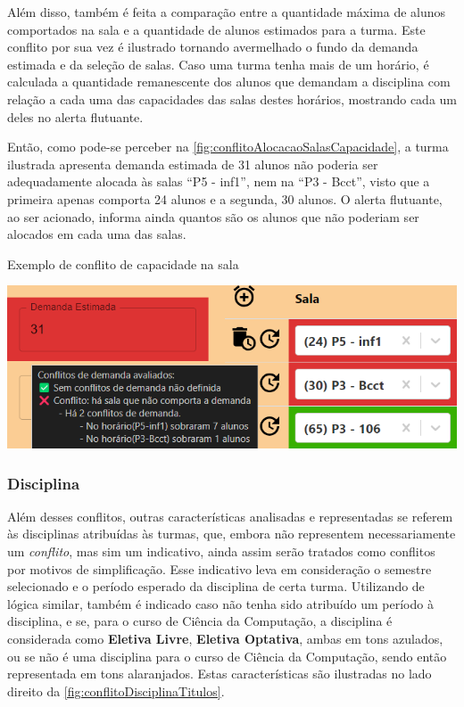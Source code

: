 Além disso, também é feita a comparação entre a quantidade máxima de alunos comportados na sala e a quantidade de alunos estimados para a turma. Este conflito por sua vez é ilustrado tornando avermelhado o fundo da demanda estimada e da seleção de salas. Caso uma turma tenha mais de um horário, é calculada a quantidade remanescente dos alunos que demandam a disciplina com relação a cada uma das capacidades das salas destes horários, mostrando cada um deles no alerta flutuante.

Então, como pode-se perceber na \autoref{fig:conflitoAlocacaoSalasCapacidade}, a turma ilustrada apresenta demanda estimada de 31 alunos não poderia ser adequadamente alocada às salas ``P5 - inf1'', nem na ``P3 - Bcct'', visto que a primeira apenas comporta 24 alunos e a segunda, 30 alunos. O alerta flutuante, ao ser acionado, informa ainda quantos são os alunos que não poderiam ser alocados em cada uma das salas.

\begin{MyCenteredFigure} \caption{Exemplo de conflito de capacidade na sala} \label{fig:conflitoAlocacaoSalasCapacidade}
  \includegraphics[width=\textwidth]{files/img/2.02!5-desenvolvimento/2.02!5.1.5-conflitos/Demanda X Capacidade}
\end{MyCenteredFigure}

\subsubsection{Disciplina} \label{sssec:Disciplina}

Além desses conflitos, outras características analisadas e representadas se referem às disciplinas atribuídas às turmas, que, embora não representem necessariamente um \textit{conflito}, mas sim um indicativo, ainda assim serão tratados como conflitos por motivos de simplificação. Esse indicativo leva em consideração o semestre selecionado e o período esperado da disciplina de certa turma. Utilizando de lógica similar, também é indicado caso não tenha sido atribuído um período à disciplina, e se, para o curso de Ciência da Computação, a disciplina é considerada como \textbf{Eletiva Livre}, \textbf{Eletiva Optativa}, ambas em tons azulados, ou se não é uma disciplina para o curso de Ciência da Computação, sendo então representada em tons alaranjados. Estas características são ilustradas no lado direito da \autoref{fig:conflitoDisciplinaTitulos}.

